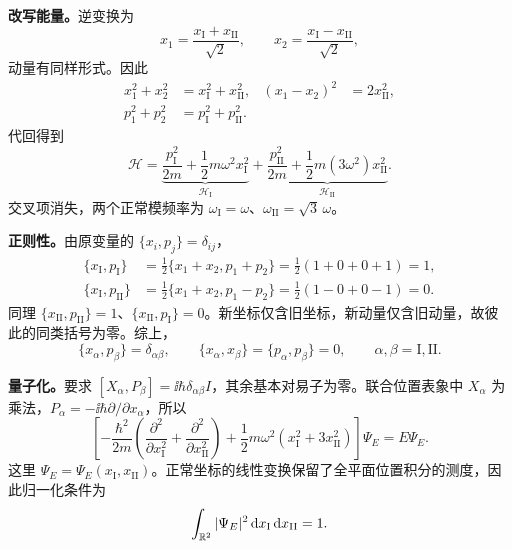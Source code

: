 \begin{checkedsolution}
\textbf{改写能量。}逆变换为
\begin{equation}
  x_1=\frac{x_{\mathrm I}+x_{\mathrm{II}}}{\sqrt2},\qquad
  x_2=\frac{x_{\mathrm I}-x_{\mathrm{II}}}{\sqrt2},
\end{equation}
动量有同样形式。因此
\begin{align}
  x_1^2+x_2^2&=x_{\mathrm I}^2+x_{\mathrm{II}}^2,
  &(x_1-x_2)^2&=2x_{\mathrm{II}}^2,\\
  p_1^2+p_2^2&=p_{\mathrm I}^2+p_{\mathrm{II}}^2.
\end{align}
代回得到
\begin{equation}
  \boxed{\mathcal H=
   \underbrace{\frac{p_{\mathrm I}^2}{2m}
      +\frac12m\omega^2x_{\mathrm I}^2}_{\mathcal H_{\mathrm I}}
   +\underbrace{\frac{p_{\mathrm{II}}^2}{2m}
      +\frac12m(3\omega^2)x_{\mathrm{II}}^2}_{\mathcal H_{\mathrm{II}}}}.
\end{equation}
交叉项消失，两个正常模频率为 $\omega_{\mathrm I}=\omega$、$\omega_{\mathrm{II}}=\sqrt3\,\omega$。

\textbf{正则性。}由原变量的 $\{x_i,p_j\}=\delta_{ij}$，
\begin{align}
  \{x_{\mathrm I},p_{\mathrm I}\}
    &=\tfrac12\{x_1+x_2,p_1+p_2\}
      =\tfrac12(1+0+0+1)=1,\\
  \{x_{\mathrm I},p_{\mathrm{II}}\}
    &=\tfrac12\{x_1+x_2,p_1-p_2\}
      =\tfrac12(1-0+0-1)=0.
\end{align}
同理 $\{x_{\mathrm{II}},p_{\mathrm{II}}\}=1$、$\{x_{\mathrm{II}},p_{\mathrm I}\}=0$。新坐标仅含旧坐标，新动量仅含旧动量，故彼此的同类括号为零。综上，
\begin{equation}
  \{x_\alpha,p_\beta\}=\delta_{\alpha\beta},\qquad
  \{x_\alpha,x_\beta\}=\{p_\alpha,p_\beta\}=0,
  \qquad \alpha,\beta=\mathrm I,\mathrm{II}.
\end{equation}

\textbf{量子化。}要求 $[X_\alpha,P_\beta]=\ii\hbar\delta_{\alpha\beta}I$，其余基本对易子为零。联合位置表象中 $X_\alpha$ 为乘法，$P_\alpha=-\ii\hbar\partial/\partial x_\alpha$，所以
\begin{equation}
  \boxed{\left[
     -\frac{\hbar^2}{2m}\left(
       \frac{\partial^2}{\partial x_{\mathrm I}^2}
       +\frac{\partial^2}{\partial x_{\mathrm{II}}^2}\right)
     +\frac12m\omega^2(x_{\mathrm I}^2+3x_{\mathrm{II}}^2)
   \right]\Psi_E=E\Psi_E}.
\end{equation}
这里 $\Psi_E=\Psi_E(x_{\mathrm I},x_{\mathrm{II}})$。正常坐标的线性变换保留了全平面位置积分的测度，因此归一化条件为
\begin{equation}
  \int_{\mathbb{R}^2}|\Psi_E|^2\mathop{}\!\mathrm{d} x_{\mathrm I}\mathop{}\!\mathrm{d} x_{\mathrm{II}}=1.
\end{equation}


\end{checkedsolution}
